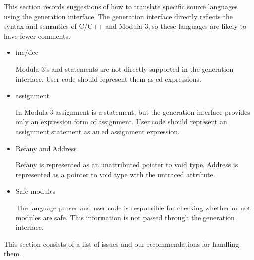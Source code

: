 \label{sec:lang}

This section records suggestions of how to translate specific source
languages using the generation interface.  The generation interface
directly reflects the syntax and semantics of C/C++ and Modula-3, so
these languages are likely to have fewer comments.  


\begin{itemize}
\item inc/dec 

Modula-3's  and  statements are not
directly supported in the generation interface.  User code should
represent them as ed expressions.

\item assignment 

In Modula-3 assignment is a statement, but the
generation interface provides only an expression form of assignment.
User code should represent an assignment statement as an
ed assignment expression.

\item Refany and Address

Refany is represented as an unattributed pointer to void type.
Address is represented as a pointer to void type with the untraced
attribute.

\item Safe modules

The language parser and user code is responsible for checking whether
or not modules are safe.  This information is not passed through the
generation interface.

\end{itemize}


This section consists of a list of issues and our recommendations for
handling them.

